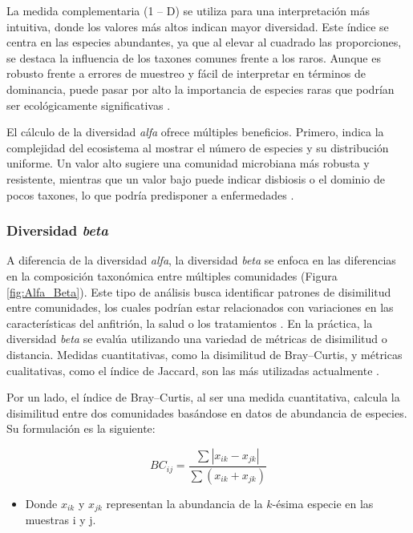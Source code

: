 La medida complementaria (1 – D) se utiliza para una interpretación más intuitiva, donde los valores más altos indican mayor diversidad. Este índice se centra en las especies abundantes, ya que al elevar al cuadrado las proporciones, se destaca la influencia de los taxones comunes frente a los raros. Aunque es robusto frente a errores de muestreo y fácil de interpretar en términos de dominancia, puede pasar por alto la importancia de especies raras que podrían ser ecológicamente significativas \cite{finotello2018measuring}.


El cálculo de la diversidad \textit{alfa} ofrece múltiples beneficios. Primero, indica la complejidad del ecosistema al mostrar el número de especies y su distribución uniforme. Un valor alto sugiere una comunidad microbiana más robusta y resistente, mientras que un valor bajo puede indicar disbiosis o el dominio de pocos taxones, lo que podría predisponer a enfermedades \cite{hagerty2020empirically}.

\subsubsection{Diversidad \textit{beta}}

A diferencia de la diversidad \textit{alfa}, la diversidad \textit{beta} se enfoca en las diferencias en la composición taxonómica entre múltiples comunidades (Figura \ref{fig:Alfa_Beta}). Este tipo de análisis busca identificar patrones de disimilitud entre comunidades, los cuales podrían estar relacionados con variaciones en las características del anfitrión, la salud o los tratamientos \cite{kers2022power}. En la práctica, la diversidad \textit{beta} se evalúa utilizando una variedad de métricas de disimilitud o distancia. Medidas cuantitativas, como la disimilitud de Bray–Curtis, y métricas cualitativas, como el índice de Jaccard, son las más utilizadas actualmente \cite{finotello2018measuring}.

Por un lado, el índice de Bray–Curtis, al ser una medida cuantitativa, calcula la disimilitud entre dos comunidades basándose en datos de abundancia de especies. Su formulación es la siguiente:

\begin{equation}
BC_{ij} = \frac{\sum |x_{ik} - x_{jk}|}{\sum (x_{ik} + x_{jk})}
\end{equation}
\begin{itemize}
\item Donde $x_{ik}$ y $x_{jk}$ representan la abundancia de la $k$-ésima especie en las muestras i y j. 
\end{itemize}

